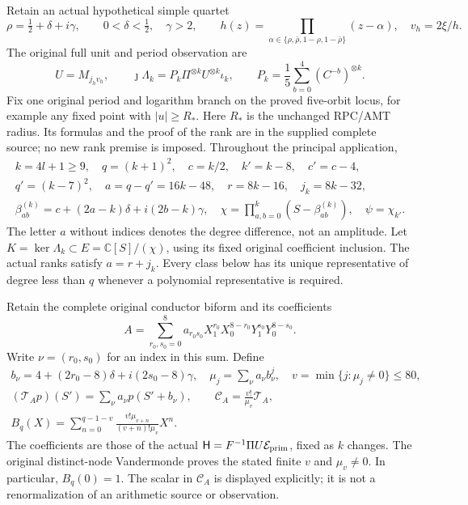\documentclass[11pt,a4paper]{article}
\begin{document}
Retain an actual hypothetical simple quartet
\[
 \rho=\tfrac12+\delta+i\gamma,\qquad0<\delta<\tfrac12,\quad\gamma>2,
 \qquad h(z)=\prod_{\alpha\in\{\rho,\bar\rho,1-\rho,1-\bar\rho\}}(z-\alpha),
 \quad v_h=2\xi/h.
\]
The original full unit and period observation are
\[
 U=M_{j_hv_h},\qquad
 \jmath\Lambda_k=P_k\Pi^{\otimes k}U^{\otimes k}\iota_k,
 \qquad P_k=\frac15\sum_{b=0}^4(C^{-b})^{\otimes k}.
 \tag{FEX1}
\]
Fix one original period and logarithm branch on the proved five-orbit
locus, for example any fixed point with $|u|\ge R_*$. Here $R_*$ is the
unchanged RPC/AMT radius. Its formulas and the proof of the rank are in
the supplied complete source; no new rank premise is imposed.
Throughout the principal application,
\[
\begin{gathered}
 k=4l+1\ge9,\quad q=(k+1)^2,\quad c=k/2,\quad k'=k-8,\quad c'=c-4,\\
 q'=(k-7)^2,\quad a=q-q'=16k-48,\quad r=8k-16,\quad j_k=8k-32,\\
 \beta_{ab}^{(k)}=c+(2a-k)\delta+i(2b-k)\gamma,\quad
 \chi=\prod_{a,b=0}^k(S-\beta_{ab}^{(k)}),\quad \psi=\chi_{k'}.
\end{gathered}\tag{FEX2}
\]
The letter $a$ without indices denotes the degree difference, not an
amplitude. Let $K=\ker\Lambda_k\subset E=\mathbb C[S]/(\chi)$, using its
fixed original coefficient inclusion. The actual ranks satisfy
$a=r+j_k$. Every class below has its unique representative of degree
less than $q$ whenever a polynomial representative is required.

Retain the complete original conductor biform and its coefficients
\[
A=\sum_{r_0,s_0=0}^8a_{r_0s_0}X_1^{r_0}X_0^{8-r_0}Y_1^{s_0}Y_0^{8-s_0}.
\]
Write $\nu=(r_0,s_0)$ for an index in this sum. Define
\[
\begin{gathered}
 b_\nu=4+(2r_0-8)\delta+i(2s_0-8)\gamma,\quad
 \mu_j=\sum_\nu a_\nu b_\nu^j,\quad
 v=\min\{j:\mu_j\ne0\}\le80,\\
 (\mathcal T_Ap)(S')=\sum_\nu a_\nu p(S'+b_\nu),\qquad
 \mathcal C_A=\frac{v!}{\mu_v}\mathcal T_A,\\
 B_q(X)=\sum_{n=0}^{q-1-v}
       \frac{v!\mu_{v+n}}{(v+n)!\mu_v}X^n.
\end{gathered}\tag{FEX3}
\]
The coefficients are those of the actual $\mathsf H=F^{-1}\Pi U
\mathcal E_{\rm prim}$, fixed as $k$ changes. The original distinct-node
Vandermonde proves the stated finite $v$ and $\mu_v\ne0$. In particular,
$B_q(0)=1$. The scalar in $\mathcal C_A$ is displayed explicitly; it is
not a renormalization of an arithmetic source or observation.
\end{document}

